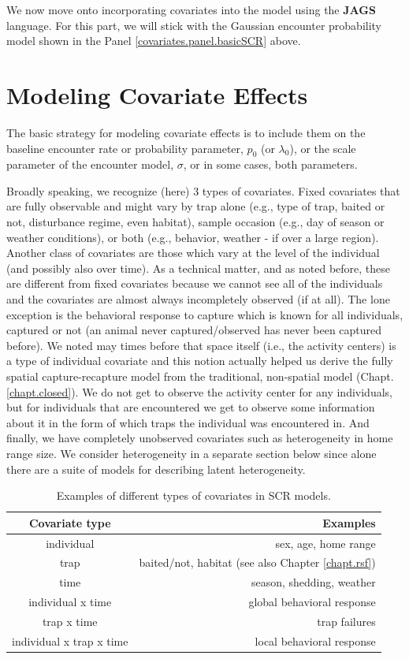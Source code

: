 We  now move onto incorporating
covariates into the model using the {\bf JAGS}
language.  For this part, we will stick with the Gaussian encounter
probability model
 shown in the Panel \ref{covariates.panel.basicSCR} above.


\section{Modeling Covariate Effects}

The basic strategy for modeling covariate effects is to include them
on the baseline encounter rate or probability parameter, $p_{0}$ (or
$\lambda_{0}$), or the scale parameter of the encounter model,
$\sigma$, or in some cases, both parameters.

Broadly speaking, we recognize (here) 3 types of covariates. Fixed
covariates that are fully observable and might vary by trap alone
(e.g., type of trap, baited or not, disturbance regime, even habitat),
sample occasion (e.g., day of season or weather conditions), or both
(e.g., behavior, weather - if over a large region).  Another class
of covariates are those which vary at the level of the individual (and
possibly also over time).  As a technical matter, and as noted before,
these are different from fixed covariates because we cannot see all of
the individuals and the covariates are almost always incompletely
observed (if at all).  The lone exception is the behavioral response
to capture which is known for all individuals, captured or not (an
animal never captured/observed has never been captured before).  We
noted may times before that space itself (i.e., the activity centers)
is a type of individual covariate and this notion actually helped us
derive the fully spatial capture-recapture model from the traditional,
non-spatial model (Chapt. \ref{chapt.closed}). We do not get to observe
the activity center for any individuals, but for individuals that are
encountered we get to observe some information about it in the form of
which traps the individual was encountered in.  And finally, we have
completely unobserved covariates such as heterogeneity in home range
size.  We consider heterogeneity in a separate section below since 
alone there are 
a suite of models for describing  latent heterogeneity. 

\begin{table}[ht]
\centering
\caption{Examples of different types of covariates in SCR models.}
\begin{tabular}{cr}
\hline \hline
Covariate type & Examples \\
\hline
individual & sex, age, home range \\
trap  &  baited/not, habitat (see also Chapter \ref{chapt.rsf}) \\
time  &  season, shedding,  weather  \\
individual x time    &    global behavioral response \\
trap x time     &       trap failures  \\ 
individual x trap x time  &   local behavioral response  \\ \hline
\end{tabular}
\label{covariates.tab.covclass}
\end{table}


